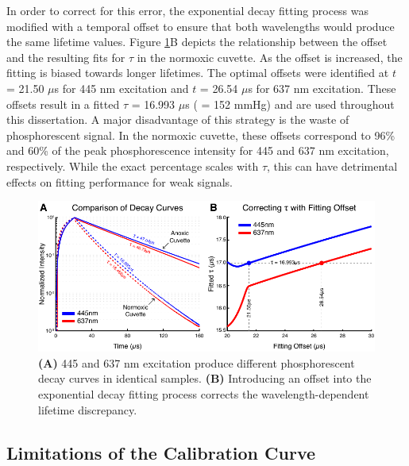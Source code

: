 In order to correct for this error, the exponential decay fitting process was modified with a temporal offset to ensure that both wavelengths would produce the same lifetime values. Figure \ref{fig:offsetcorrection}B depicts the relationship between the offset and the resulting fits for $\tau$ in the normoxic cuvette. As the offset is increased, the fitting is biased towards longer lifetimes. The optimal offsets were identified at $t$ = 21.50 $\mu$s for 445 nm excitation and $t$ = 26.54 $\mu$s for 637 nm excitation. These offsets result in a fitted $\tau$ = 16.993 $\mu$s ( = 152 mmHg) and are used throughout this dissertation. A major disadvantage of this strategy is the waste of phosphorescent signal. In the normoxic cuvette, these offsets correspond to 96\% and 60\% of the peak phosphorescence intensity for 445 and 637 nm excitation, respectively. While the exact percentage scales with $\tau$, this can have detrimental effects on fitting performance for weak signals.

\begin{figure}
    \includegraphics{figures/chapter_2/offsetcorrection.pdf}
    \caption{
        \label{fig:offsetcorrection}
        \textbf{(A)} 445 and 637 nm excitation produce different phosphorescent decay curves in identical samples. \textbf{(B)} Introducing an offset into the exponential decay fitting process corrects the wavelength-dependent lifetime discrepancy.
    }
\end{figure}

\subsection{Limitations of the Calibration Curve} \label{ssec:calibration_limit}

